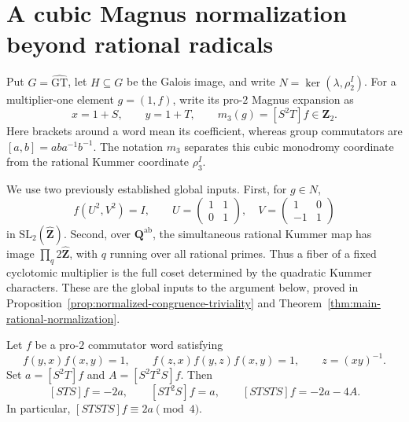
\section{A cubic Magnus normalization beyond rational radicals}
\label{sec:cubic-magnus-normalization}

Put $G=\widehat{\mathrm{GT}}$, let $H\subseteq G$ be the Galois image, and
write $N=\ker(\lambda,\rho_2^I)$.  For a multiplier-one element
$g=(1,f)$, write its pro-$2$ Magnus expansion as
\[
 x=1+S,\qquad y=1+T,\qquad
 m_3(g)=[S^2T]f\in\mathbf Z_2.
\]
Here brackets around a word mean its coefficient, whereas group commutators
are $[a,b]=aba^{-1}b^{-1}$.  The notation $m_3$ separates this cubic
monodromy coordinate from the rational Kummer coordinate $\rho_3^I$.

We use two previously established global inputs.  First, for $g\in N$,
\begin{equation}\label{eq:magnus-normalized-congruence-input}
 f(U^2,V^2)=I,
 \qquad
 U=\begin{pmatrix}1&1\\0&1\end{pmatrix},\quad
 V=\begin{pmatrix}1&0\\-1&1\end{pmatrix}
\end{equation}
in $\mathrm{SL}_2(\widehat{\mathbf Z})$.  Second, over
$\mathbf Q^{\mathrm{ab}}$, the simultaneous rational Kummer map has image
$\prod_q2\widehat{\mathbf Z}$, with $q$ running over all rational primes.
Thus a fiber of a fixed cyclotomic multiplier is the full coset determined
by the quadratic Kummer characters.  These are the global inputs to the argument below, proved in
Proposition~\ref{prop:normalized-congruence-triviality} and
Theorem~\ref{thm:main-rational-normalization}.

\begin{lemma}
\label{lem:integral-alternating-cubic}
Let $f$ be a pro-$2$ commutator word satisfying
\[
 f(y,x)f(x,y)=1,\qquad
 f(z,x)f(y,z)f(x,y)=1,\qquad z=(xy)^{-1}.
\]
Set $a=[S^2T]f$ and $A=[S^2T^2S]f$.  Then
\begin{equation}\label{eq:alternating-cubic-identity}
 [STS]f=-2a,\qquad [ST^2S]f=a,\qquad
 [STSTS]f=-2a-4A.
\end{equation}
In particular, $[STSTS]f\equiv2a\pmod4$.
\end{lemma}

